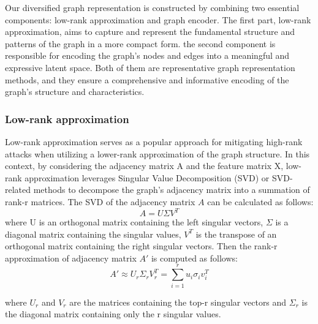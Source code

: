 \documentclass[conference]{IEEEtran}
\begin{document}
Our diversified graph representation is constructed by combining two essential components: low-rank approximation and graph encoder. The first part, low-rank approximation, aims to capture and represent the fundamental structure and patterns of the graph in a more compact form. the second component is responsible for encoding the graph's nodes and edges into a meaningful and expressive latent space. Both of them are representative graph representation methods, and they ensure a comprehensive and informative encoding of the graph's structure and characteristics.

\subsubsection{Low-rank approximation} Low-rank approximation serves as a popular approach for mitigating high-rank attacks when utilizing a lower-rank approximation of the graph structure. In this context, by considering the adjacency matrix A and the feature matrix X, low-rank approximation leverages Singular Value Decomposition (SVD) \cite{Wall2002SingularVD} or SVD-related methods to decompose the graph's adjacency matrix into a summation of rank-r matrices. The SVD of the adjacency matrix $A$ can be calculated as follows:
\begin{equation}
\label{svd-form1}
 A= U \Sigma V^T
\end{equation}
where U is an orthogonal matrix containing the left singular vectors,
$\Sigma$ is a diagonal matrix containing the singular values, $ V^T $ is the transpose of an orthogonal matrix containing the right singular vectors. Then the rank-r approximation of adjacency matrix $A'$ is computed as follows:
\begin{equation}
\label{svd-form2}
A' \approx U_r \Sigma_r V_r^T = \sum_{i=1}^r u_i \sigma_i v_i ^T
\end{equation}

where $U_r$ and $V_r$ are the matrices containing the top-r singular vectors and $\Sigma_r$ is the diagonal matrix containing only the r singular values.
\end{document}
